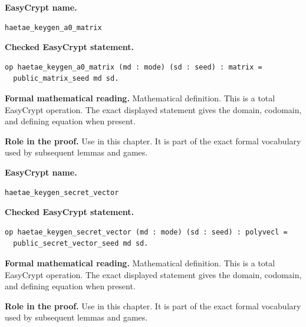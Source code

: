 \begin{formaldefinition}
\noindent\textbf{EasyCrypt name.}
\begin{lstlisting}[language=EasyCrypt,basicstyle=\ttfamily\scriptsize]
haetae_keygen_a0_matrix
\end{lstlisting}
\noindent\textbf{Checked EasyCrypt statement.}
\begin{lstlisting}[language=EasyCrypt,basicstyle=\ttfamily\scriptsize]
op haetae_keygen_a0_matrix (md : mode) (sd : seed) : matrix =
  public_matrix_seed md sd.
\end{lstlisting}
\noindent\textbf{Formal mathematical reading.}
Mathematical definition. This is a total EasyCrypt operation.  The exact displayed statement gives the domain, codomain, and defining equation when present.

\noindent\textbf{Role in the proof.}
Use in this chapter. It is part of the exact formal vocabulary used by subsequent lemmas and games.

\end{formaldefinition}

\begin{formaldefinition}
\noindent\textbf{EasyCrypt name.}
\begin{lstlisting}[language=EasyCrypt,basicstyle=\ttfamily\scriptsize]
haetae_keygen_secret_vector
\end{lstlisting}
\noindent\textbf{Checked EasyCrypt statement.}
\begin{lstlisting}[language=EasyCrypt,basicstyle=\ttfamily\scriptsize]
op haetae_keygen_secret_vector (md : mode) (sd : seed) : polyvecl =
  public_secret_vector_seed md sd.
\end{lstlisting}
\noindent\textbf{Formal mathematical reading.}
Mathematical definition. This is a total EasyCrypt operation.  The exact displayed statement gives the domain, codomain, and defining equation when present.

\noindent\textbf{Role in the proof.}
Use in this chapter. It is part of the exact formal vocabulary used by subsequent lemmas and games.

\end{formaldefinition}

